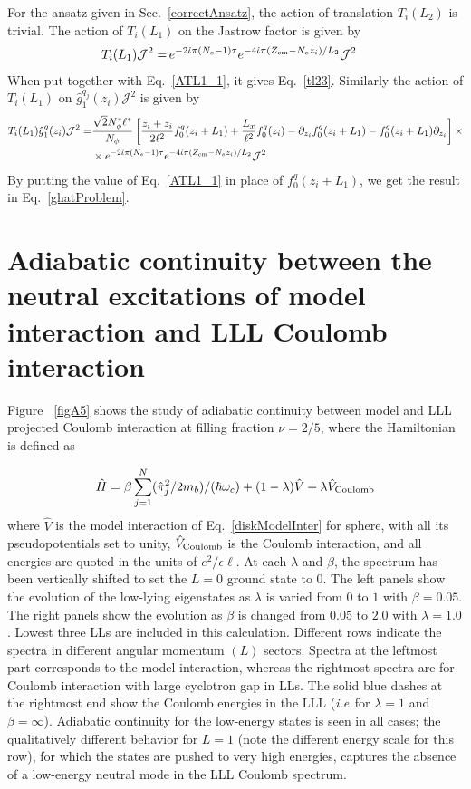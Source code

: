 \documentclass[prb,aps,epsfig,longbibliography,twocolumn]{revtex4-1}
\newcommand{\ie}{\emph{i.e.}\,}
\newcommand{\sbkt}[1]{\left[ #1\right]}
\newcommand{\np}{N_{\phi}}
\newcommand{\iiota}{\dot{\iota}}
\begin{document}
For the ansatz given in Sec.~\ref{correctAnsatz}, the action of  translation  $T_i(L_2)$ is trivial. The action of $T_i(L_1)$ on the Jastrow factor is given by
\begin{align}
	T_i(L_1)\mathcal{J}^2 =&\,  e^{-2\iiota\pi(N_e-1)\tau}e^{-4\iiota\pi (Z_{\rm cm}-N_e z_i)/L_2}\mathcal{J}^2
\end{align}
When put together with Eq.~\eqref{ATL1_1}, it gives Eq.~\eqref{tl23}. Similarly the action of $T_i(L_1)$ on $ \hat{g}_1^{q_j}(z_i)\mathcal{J}^2$ is given by
\begin{align}
T_i(L_1)\hat{g}_1^{q}(z_i)\mathcal{J}^2=& \frac{\sqrt{2}\np^*\ell^*}{\np} \sbkt{ \frac{\bar{z}_i+z_i}{2\ell^{2}}f^{q}_0(z_i+L_1)+ \frac{L_x}{\ell^{2}}f^{q}_0(z_i) - \partial_{z_i} f^{q}_0(z_i+L_1) - f^{q}_0(z_i+L_1) \partial_{z_i}} \times \nonumber \\
& \times e^{-2\iiota\pi(N_e-1)\tau}e^{-4\iiota\pi (Z_{\rm cm}-N_e z_i)/L_2}\mathcal{J}^2
\end{align}
By putting the value of Eq.~\ref{ATL1_1} in place of $f^{q}_0(z_i+L_1)$, we get the result in Eq.~\ref{ghatProblem}.


\section{Adiabatic continuity between the neutral excitations of model interaction and LLL Coulomb interaction} \label{NeutralModesAdiabatic}

Figure ~\ref{figA5} shows the study of adiabatic continuity between model and LLL projected Coulomb interaction at filling fraction $\nu=2/5$, where the Hamiltonian is defined as

\begin{equation}
\hat{H}=\beta \sum_{j=1}^N (\hat{\pi}_j^2/2m_b)/(\hbar \omega_c) + (1-\lambda)\hat{V} + \lambda \hat{V}_{\rm Coulomb}
\end{equation}
where $\hat{V}$ is the model interaction of Eq.~\ref{diskModelInter} for sphere, with all its pseudopotentials set to unity, $\hat{V}_{\rm Coulomb}$ is the Coulomb interaction, and all energies are quoted in the units of $e^2/\epsilon \ell$. At each $\lambda$ and $\beta$, the spectrum has been vertically shifted to set the $L=0$ ground state to $0$. The left panels show the evolution of the low-lying eigenstates as $\lambda$ is varied from $0$ to $1$ with $\beta=0.05$. The right panels show the evolution as $\beta$ is changed from $0.05$ to $2.0$ with $\lambda=1.0$. Lowest three LLs are included in this calculation. Different rows indicate the spectra in different angular momentum $(L)$ sectors. Spectra at the leftmost part corresponds to the model interaction, whereas the rightmost spectra are for Coulomb interaction with large cyclotron gap in LLs. The solid blue dashes at the rightmost end show the Coulomb energies in the LLL (\ie for $\lambda=1$ and $\beta=\infty$). Adiabatic continuity for the low-energy states is seen in all cases; the qualitatively different behavior for $L=1$ (note the different energy scale for this row), for which the states are pushed to very high energies, captures the absence of a low-energy neutral mode in the LLL Coulomb spectrum.
\end{document}
